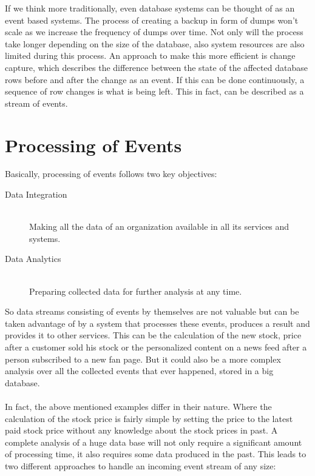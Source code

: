 If we think more traditionally, even database systems can be thought of as an
event based systems. The process of creating a backup in form of dumps won't
scale as we increase the frequency of dumps over time. Not only will the process
take longer depending on the size of the database, also system resources are also
limited during this process. An approach to make this more efficient 
is change capture, which describes the difference between the state of the
affected database rows before and after the change as an event. If this can be done
continuously, a sequence of row changes is what is being left. This in fact,
can be described as a stream of events.

\section{Processing of Events}
Basically, processing of events follows two key objectives: 
\begin{description}
    \item [Data Integration] \hfill \\ Making all the data of an organization available in all its services and systems.
    \item [Data Analytics]  \hfill \\ Preparing collected data for further analysis at any time. 
\end{description}

So data streams consisting of events by themselves are not valuable but
can be taken advantage of by a system that processes these events, produces a
result and provides it to other services. This can be the calculation of the new
stock, price after a customer sold his stock or the personalized content on a
news feed after a person subscribed to a new fan page. But it could also be a
more complex analysis over all the collected events that ever happened, stored in
a big database. 
\\ \\
In fact, the above mentioned examples differ in their nature. Where the
calculation of the stock price is fairly simple by setting the price to the
latest paid stock price without any knowledge about the stock prices in past.
A complete analysis of a huge data base will not only require a
significant amount of processing time, it also requires some data produced in the
past. This leads to two different approaches to handle an incoming event stream
of any size: 

